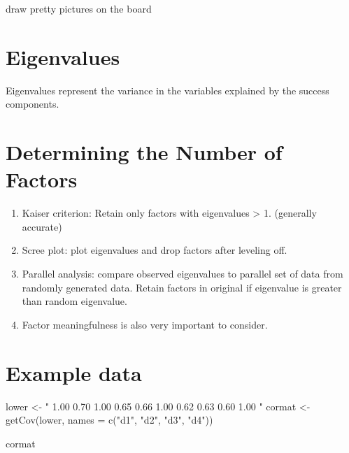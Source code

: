 \documentclass[
]{book}
\newenvironment{Shaded}{\begin{snugshade}}{\end{snugshade}}
\newcommand{\AttributeTok}[1]{\textcolor[rgb]{0.77,0.63,0.00}{#1}}
\newcommand{\FunctionTok}[1]{\textcolor[rgb]{0.00,0.00,0.00}{#1}}
\newcommand{\NormalTok}[1]{#1}
\newcommand{\OtherTok}[1]{\textcolor[rgb]{0.56,0.35,0.01}{#1}}
\newcommand{\StringTok}[1]{\textcolor[rgb]{0.31,0.60,0.02}{#1}}
\providecommand{\tightlist}{%
  \setlength{\itemsep}{0pt}\setlength{\parskip}{0pt}}
\begin{document}
draw pretty pictures on the board

\hypertarget{eigenvalues}{%
\section{Eigenvalues}\label{eigenvalues}}

Eigenvalues represent the variance in the variables explained by the success components.

\hypertarget{determining-the-number-of-factors}{%
\section{Determining the Number of Factors}\label{determining-the-number-of-factors}}

\begin{enumerate}
\def\labelenumi{\arabic{enumi}.}
\tightlist
\item
  Kaiser criterion: Retain only factors with eigenvalues \textgreater{} 1. (generally accurate)
\item
  Scree plot: plot eigenvalues and drop factors after leveling off.
\item
  Parallel analysis: compare observed eigenvalues to parallel set of data from randomly generated data. Retain factors in original if eigenvalue is greater than random eigenvalue.
\item
  Factor meaningfulness is also very important to consider.
\end{enumerate}

\hypertarget{example-data}{%
\section{Example data}\label{example-data}}

\begin{Shaded}
\begin{Highlighting}[]
\NormalTok{lower }\OtherTok{\textless{}{-}} \StringTok{"}
\StringTok{1.00}
\StringTok{0.70 1.00}
\StringTok{0.65 0.66 1.00}
\StringTok{0.62 0.63 0.60 1.00}
\StringTok{"}
\NormalTok{cormat }\OtherTok{\textless{}{-}} \FunctionTok{getCov}\NormalTok{(lower, }\AttributeTok{names =} \FunctionTok{c}\NormalTok{(}\StringTok{"d1"}\NormalTok{, }\StringTok{"d2"}\NormalTok{, }\StringTok{"d3"}\NormalTok{, }\StringTok{"d4"}\NormalTok{))}

\NormalTok{cormat}
\end{Highlighting}
\end{Shaded}
\end{document}
